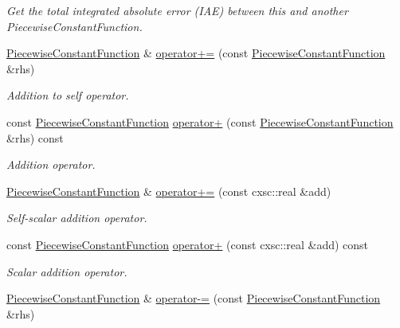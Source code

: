 \begin{DoxyCompactItemize}
\begin{DoxyCompactList}\small\item\em \-Get the total integrated absolute error (\-I\-A\-E) between this and another \-Piecewise\-Constant\-Function. \end{DoxyCompactList}\item 
\hyperlink{classsubpavings_1_1PiecewiseConstantFunction}{\-Piecewise\-Constant\-Function} \& \hyperlink{classsubpavings_1_1PiecewiseConstantFunction_a13d88986c0752e996fced71cae4e3034}{operator+=} (const \hyperlink{classsubpavings_1_1PiecewiseConstantFunction}{\-Piecewise\-Constant\-Function} \&rhs)
\begin{DoxyCompactList}\small\item\em \-Addition to self operator. \end{DoxyCompactList}\item 
const \hyperlink{classsubpavings_1_1PiecewiseConstantFunction}{\-Piecewise\-Constant\-Function} \hyperlink{classsubpavings_1_1PiecewiseConstantFunction_a324236b21b578ef2176a487d10b986b5}{operator+} (const \hyperlink{classsubpavings_1_1PiecewiseConstantFunction}{\-Piecewise\-Constant\-Function} \&rhs) const 
\begin{DoxyCompactList}\small\item\em \-Addition operator. \end{DoxyCompactList}\item 
\hyperlink{classsubpavings_1_1PiecewiseConstantFunction}{\-Piecewise\-Constant\-Function} \& \hyperlink{classsubpavings_1_1PiecewiseConstantFunction_afb8037a02dafaab611e4aac28a7326ab}{operator+=} (const cxsc\-::real \&add)
\begin{DoxyCompactList}\small\item\em \-Self-\/scalar addition operator. \end{DoxyCompactList}\item 
const \hyperlink{classsubpavings_1_1PiecewiseConstantFunction}{\-Piecewise\-Constant\-Function} \hyperlink{classsubpavings_1_1PiecewiseConstantFunction_a63956842071d1e793d54ddc6cf759970}{operator+} (const cxsc\-::real \&add) const 
\begin{DoxyCompactList}\small\item\em \-Scalar addition operator. \end{DoxyCompactList}\item 
\hyperlink{classsubpavings_1_1PiecewiseConstantFunction}{\-Piecewise\-Constant\-Function} \& \hyperlink{classsubpavings_1_1PiecewiseConstantFunction_ae64b7e32740671dd8fb0f0905f958de5}{operator-\/=} (const \hyperlink{classsubpavings_1_1PiecewiseConstantFunction}{\-Piecewise\-Constant\-Function} \&rhs)

\end{DoxyCompactItemize}
